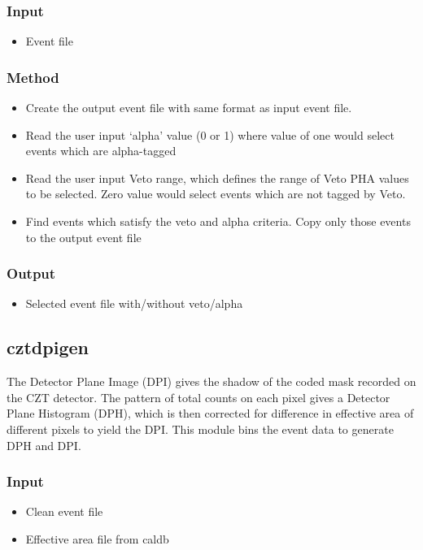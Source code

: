 \documentclass[11pt,oneside,a4paper]{article}
\begin{document}
\subsubsection*{Input}
\renewcommand\labelitemi{{\boldmath$\cdot$}}
\begin{itemize}
\item{Event file}
\end{itemize}
\subsubsection*{Method}
\begin{itemize}
\item{Create the output event file with same format as input event file.} 
\item{Read the user input ‘alpha’ value (0 or 1) where value of one would 
select events which are alpha-tagged}
\item{Read the user input Veto range, which defines the range of Veto PHA values 
to be selected. Zero value would select events which are not tagged by Veto.}
\item{Find events which satisfy the veto and alpha criteria. Copy 
only those events to the output event file}
\end{itemize}
\subsubsection*{Output}
\begin{itemize}
    \item{Selected event file with/without veto/alpha}
\end{itemize}


\subsection{cztdpigen}
The Detector Plane Image (DPI) gives the shadow of the coded mask recorded
 on the CZT detector. The pattern of total counts on each pixel gives a 
Detector Plane Histogram (DPH), which is then corrected for difference 
in effective area of different pixels to yield the DPI. This module 
bins the event data to generate DPH and DPI.

\subsubsection*{Input}
\renewcommand\labelitemi{{\boldmath$\cdot$}}
\begin{itemize}
\item{Clean event file}
\item{Effective area file from caldb}
\end{itemize}
\end{document}
